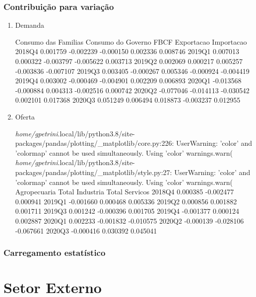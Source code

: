 \documentclass[11pt]{article}
\begin{document}
\subsubsection{Contribuição para variação}
\label{sec:orgdc34f4b}

\begin{enumerate}
\item Demanda
\label{sec:orgd4a068d}

        Consumo das Familias  Consumo do Governo      FBCF  Exportacao  Importacao
2018Q4              0.001759           -0.002239 -0.000150    0.002336    0.008746
2019Q1              0.007013            0.000322 -0.003797   -0.005622    0.003713
2019Q2              0.002069            0.000217  0.005257   -0.003836   -0.007107
2019Q3              0.003405           -0.000267  0.005346   -0.000924   -0.004419
2019Q4              0.003002           -0.000469 -0.004901    0.002209    0.006893
2020Q1             -0.013568           -0.000884  0.004313   -0.002516    0.000742
2020Q2             -0.077046           -0.014113 -0.030542    0.002101    0.017368
2020Q3              0.051249            0.006494  0.018873   -0.003237    0.012955

\item Oferta
\label{sec:org67f2b3b}

\emph{home/gpetrini}.local/lib/python3.8/site-packages/pandas/plotting/\_matplotlib/core.py:226: UserWarning: 'color' and 'colormap' cannot be used simultaneously. Using 'color'
  warnings.warn(
\emph{home/gpetrini}.local/lib/python3.8/site-packages/pandas/plotting/\_matplotlib/style.py:27: UserWarning: 'color' and 'colormap' cannot be used simultaneously. Using 'color'
  warnings.warn(
        Agropecuaria  Total Industria  Total Servicos
2018Q4      0.000385        -0.002477        0.000941
2019Q1     -0.001660         0.000468        0.005336
2019Q2      0.000856         0.001882        0.001711
2019Q3      0.001242        -0.000396        0.001705
2019Q4     -0.001377         0.000124        0.002887
2020Q1      0.002233        -0.001832       -0.010575
2020Q2     -0.000139        -0.028106       -0.067661
2020Q3     -0.000416         0.030392        0.045041
\end{enumerate}

\subsubsection{Carregamento estatístico}
\label{sec:org3b27a65}


\section{Setor Externo}
\label{sec:org4fdb780}
\end{document}
